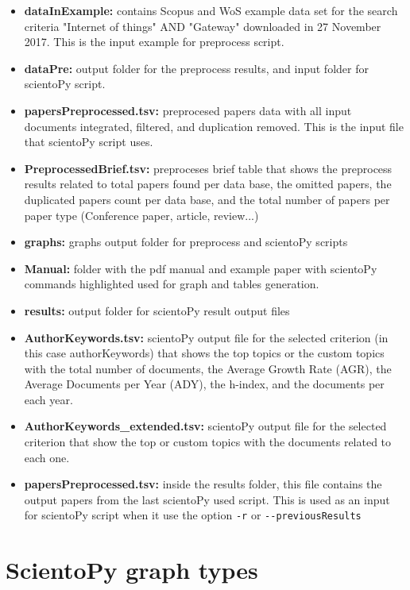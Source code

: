 \documentclass[10pt,letterpaper]{article}
\begin{document}
\begin{itemize}
	\item \textbf{dataInExample: } contains Scopus and WoS example data set for the search criteria "Internet of things" AND "Gateway" downloaded in 27 November 2017. This is the input example for preprocess script.
	\item \textbf{dataPre: } output folder for the preprocess results, and input folder for scientoPy script.
	\item \textbf{papersPreprocessed.tsv: } preprocesed papers data with all input documents integrated, filtered, and duplication removed. This is the input file that scientoPy script uses.
	\item \textbf{PreprocessedBrief.tsv: } preproceses brief table that shows the preprocess results related to total papers found per data base, the omitted papers, the duplicated papers count per data base, and the total number of papers per paper type (Conference paper, article, review...)
	\item \textbf{graphs: } graphs output folder for preprocess and scientoPy scripts
	\item \textbf{Manual: } folder with the pdf manual and example paper with scientoPy commands highlighted used for graph and tables generation. 
	\item \textbf{results: } output folder for scientoPy result output files
	\item \textbf{AuthorKeywords.tsv: } scientoPy output file for the selected criterion (in this case authorKeywords) that shows the top topics or the custom  topics with the total number of documents, the Average Growth Rate (AGR), the Average Documents per Year (ADY), the h-index, and the documents per each year. 
	\item \textbf{AuthorKeywords\_extended.tsv: } scientoPy output file for the selected criterion that show the top or custom topics with the documents related to each one.
	\item \textbf{papersPreprocessed.tsv: } inside the results folder, this file contains the output papers from the last scientoPy used script. This is used as an input for scientoPy script when it use the option \verb|-r| or \verb|--previousResults|
\end{itemize}


\section{ScientoPy graph types}
\end{document}
